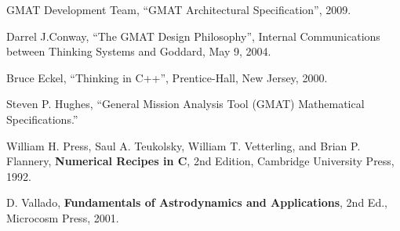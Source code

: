 \documentclass[letterpaper,10pt]{book}
\begin{document}
%


% 
\backmatter


\begin{thebibliography}{Math  Spec} %

 GMAT Development Team, ``GMAT Architectural Specification'', 2009.

 Darrel J.Conway, ``The GMAT Design Philosophy'', Internal
Communications between Thinking Systems and Goddard, May 9, 2004.

Bruce Eckel, ``Thinking in C++'', Prentice-Hall, New Jersey, 2000.

 Steven P. Hughes, ``General Mission Analysis Tool (GMAT) Mathematical
Specifications.''

 William H. Press, Saul A. Teukolsky, William T. Vetterling, and Brian
P. Flannery, \textbf{Numerical Recipes in C}, 2nd Edition, Cambridge University Press, 1992.

D. Vallado, \textbf{Fundamentals of Astrodynamics and Applications},
2nd Ed., Microcosm Press, 2001.

\end{thebibliography}

\printindex
\end{document}
